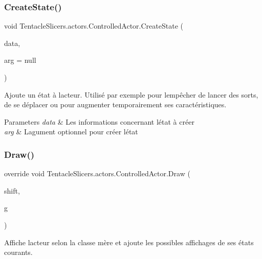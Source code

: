 \subsubsection{\texorpdfstring{Create\+State()}{CreateState()}}
{\footnotesize\ttfamily void Tentacle\+Slicers.\+actors.\+Controlled\+Actor.\+Create\+State (\begin{DoxyParamCaption}\item[{\hyperlink{class_tentacle_slicers_1_1states_1_1_state_data}{State\+Data}}]{data,  }\item[{object}]{arg = {\ttfamily null} }\end{DoxyParamCaption})}



Ajoute un état à l\textquotesingle{}acteur. Utilisé par exemple pour l\textquotesingle{}empêcher de lancer des sorts, de se déplacer ou pour augmenter temporairement ses caractéristiques. 


\begin{DoxyParams}{Parameters}
{\em data} & Les informations concernant l\textquotesingle{}état à créer \\
\hline
{\em arg} & L\textquotesingle{}agument optionnel pour créer l\textquotesingle{}état \\
\hline
\end{DoxyParams}
\mbox{\label{class_tentacle_slicers_1_1actors_1_1_controlled_actor_a8120affe933e4003bc0866f06589eeac}} 
\subsubsection{\texorpdfstring{Draw()}{Draw()}}
{\footnotesize\ttfamily override void Tentacle\+Slicers.\+actors.\+Controlled\+Actor.\+Draw (\begin{DoxyParamCaption}\item[{Point}]{shift,  }\item[{Graphics}]{g }\end{DoxyParamCaption})\hspace{0.3cm}{\ttfamily [virtual]}}



Affiche l\textquotesingle{}acteur selon la classe mère et ajoute les possibles affichages de ses états courants. 


